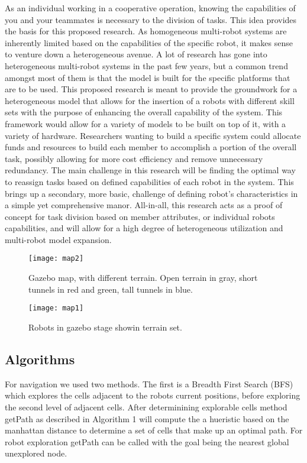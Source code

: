 As an individual working in a cooperative operation, knowing the capabilities
of you and your teammates is necessary to the division of tasks. This idea
provides the basis for this proposed research. As homogeneous multi-robot systems
are inherently limited based on the capabilities of the specific robot,
it makes sense to venture down a heterogeneous avenue. A lot of research
has gone into heterogeneous multi-robot systems in the past few years, but a
common trend amongst most of them is that the model is built for the specific
platforms that are to be used. This proposed research is meant to provide the
groundwork for a heterogeneous model that allows for the insertion of a
robots with different skill sets with the purpose of enhancing the overall
capability of the system. This framework would allow for a variety of models
to be built on top of it, with a variety of hardware. Researchers wanting to
build a specific system could allocate funds and resources to build each member
to accomplish a portion of the overall task, possibly allowing for more cost
efficiency and remove unnecessary redundancy. The main challenge in this
research will be finding the optimal way to reassign tasks based on defined
capabilities of each robot in the system. This brings up a secondary, more basic,
challenge of defining robot’s characteristics in a simple yet comprehensive manor.
All-in-all, this research acts as a proof of concept for task division based on member
attributes, or individual robots capabilities, and will allow for a high degree of
heterogeneous utilization and multi-robot model expansion.

\begin{figure}[H]
  \centering
    \texttt{[image: map2]}
  \caption{Gazebo map, with different terrain. Open terrain in gray, short tunnels in red and green, tall tunnels in blue.} \label{fig:map}
\end{figure}

\begin{figure}[H]
  \centering
    \texttt{[image: map1]}
  \caption{Robots in gazebo stage showin terrain set.}
  \label{fig:stage}
\end{figure}

\subsection{Algorithms}
For navigation we used two methods. The first is a Breadth First Search (BFS) which explores the cells adjacent to the robots
current positions, before exploring the second level of adjacent cells. After determinining explorable cells method getPath as described in Algorithm 1 will compute the a hueristic based on the manhattan distance to determine a set of cells that make up an optimal path. For robot exploration getPath can be called with the goal being the nearest global unexplored node\cite{pound}.


